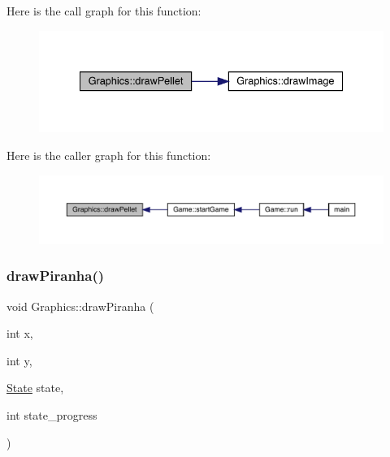 Here is the call graph for this function\+:\nopagebreak
\begin{figure}[H]
\begin{center}
\leavevmode
\includegraphics[width=335pt]{class_graphics_a63bc7bf1f68cfc785f08b6863d3034d2_cgraph}
\end{center}
\end{figure}
Here is the caller graph for this function\+:\nopagebreak
\begin{figure}[H]
\begin{center}
\leavevmode
\includegraphics[width=350pt]{class_graphics_a63bc7bf1f68cfc785f08b6863d3034d2_icgraph}
\end{center}
\end{figure}
\mbox{\label{class_graphics_a2b8425428b81e566f960928fa42133b6}} 
\subsubsection{\texorpdfstring{draw\+Piranha()}{drawPiranha()}}
{\footnotesize\ttfamily void Graphics\+::draw\+Piranha (\begin{DoxyParamCaption}\item[{int}]{x,  }\item[{int}]{y,  }\item[{\mbox{\hyperlink{_constants_8hpp_a5d74787dedbc4e11c1ab15bf487e61f8}{State}}}]{state,  }\item[{int}]{state\+\_\+progress }\end{DoxyParamCaption})}

